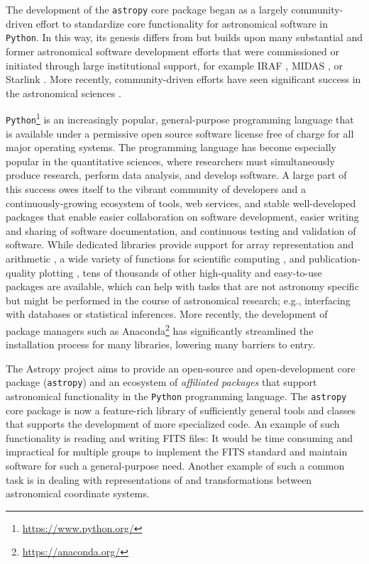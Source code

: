 \documentclass[modern]{aastex61}
\newcommand{\package}[1]{\texttt{#1}\xspace}
\newcommand{\python}{\package{Python}}
\newcommand{\astropy}{Astropy\xspace}
\newcommand{\astropypkg}{\package{astropy}}
\begin{document}
The development of the \astropypkg core package began as a largely
community-driven effort to standardize core functionality for astronomical
software in \python.
In this way, its genesis differs from but builds upon many substantial and
%
%
%
former astronomical software development efforts that were commissioned or
initiated through large institutional support, for example IRAF \citep[developed
at NOAO;][]{IRAF}, MIDAS \citep[developed at ESO;][]{MIDAS}, or Starlink
\citep[originally developed by a consortium of UK institutions and now
maintained by the East Asian Observatory;][]{starlink1982,starlink2013}.
More recently, community-driven efforts have seen significant success in the astronomical sciences \citep{yt}.

\python\footnote{\url{https://www.python.org/}} is an increasingly popular, general-purpose
programming language that is available under a permissive open source software license free of
charge for all major operating systems. The programming language has become especially popular
in the quantitative sciences, where researchers must simultaneously produce research, perform
data analysis, and develop software. A large part of this success owes itself to the vibrant
community of developers and a continuously-growing ecosystem of tools, web services, and stable
well-developed packages that enable easier collaboration on software development, easier
writing and sharing of software documentation, and continuous testing and validation of
software. While dedicated libraries provide support for array representation and
arithmetic \citep[\package{numpy};][]{numpy}, a wide variety of functions for scientific
computing \citep[\package{scipy};][]{scipy}, and publication-quality plotting
\citep[\package{matplotlib};][]{matplotlib}, tens of thousands of other high-quality and easy-to-use
packages are available, which can help with tasks that are not astronomy specific but
might be performed in the course of astronomical research; e.g., interfacing with
databases or statistical inferences. More recently, the development of package managers such as
Anaconda\footnote{\url{https://anaconda.org/}} has significantly streamlined the installation
process for many libraries, lowering many barriers to entry.

The \astropy project aims to provide an open-source and open-development core
package (\astropypkg) and an ecosystem of \emph{affiliated packages} that
support astronomical functionality in the \python programming language.
The \astropypkg core package is now a feature-rich library of sufficiently
general tools and classes that supports the development of more specialized
code. An example of such functionality is reading and writing FITS files: It would be
time consuming and impractical for multiple groups to implement the FITS
standard \citep{FITS} and maintain software for such a general-purpose need.
Another example of such a common task is in dealing with representations of and
transformations between astronomical coordinate systems.
\end{document}
